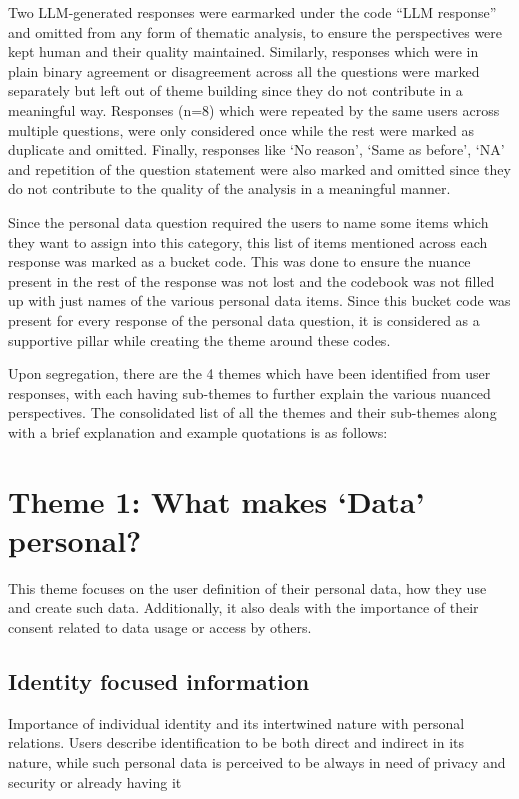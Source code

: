 Two LLM-generated responses were earmarked under the code ``LLM response'' and omitted from any form of thematic analysis, to ensure the perspectives were kept human and their quality maintained. Similarly, responses which were in plain binary agreement or disagreement across all the questions were marked separately but left out of theme building since they do not contribute in a meaningful way. Responses (n=8) which were repeated by the same users across multiple questions, were only considered once while the rest were marked as duplicate and omitted. Finally, responses like `No reason', `Same as before', `NA' and repetition of the question statement were also marked and omitted since they do not contribute to the quality of the analysis in a meaningful manner. 

Since the personal data question required the users to name some items which they want to assign into this category, this list of items mentioned across each response was marked as a bucket code. This was done to ensure the nuance present in the rest of the response was not lost and the codebook was not filled up with just names of the various personal data items. Since this bucket code was present for every response of the personal data question, it is considered as a supportive pillar while creating the theme around these codes.


Upon segregation, there are the 4 themes which have been identified from user responses, with each having sub-themes to further explain the various nuanced perspectives. The consolidated list of all the themes and their sub-themes along with a brief explanation and example quotations is as follows:

\section{Theme 1: What makes `Data' personal?} \label{T1:personal data}
This theme focuses on the user definition of their personal data, how they use and create such data. Additionally, it also deals with the importance of their consent related to data usage or access by others.

\subsection{Identity focused information} \label{T1.1:Identity}
Importance of individual identity and its intertwined nature with personal relations. Users describe identification to be both direct and indirect in its nature, while such personal data is perceived to be always in need of privacy and security or already having it

